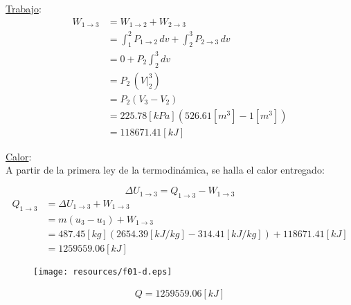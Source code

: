 \documentclass[letter,11pt]{article}
\begin{document}
\begin{enumerate}
\underline{Trabajo}: \\
\begin{equation*}
    \begin{split}
    W_{1\rightarrow 3} &= W_{1\rightarrow 2} + W_{2\rightarrow 3} \\
                       &= \int_1^2 P_{1\rightarrow 2}\,dv
                          + \int_2^3 P_{2\rightarrow 3}\,dv \\
                       &= 0 + P_2 \int_2^3 dv \\
                       &= P_2\,(V\Biggr|_2^3) \\
                       &= P_2(V_3-V_2) \\
                       &= 225.78[kPa](526.61[m^3]-1[m^3]) \\
                       &= 118671.41[kJ]
    \end{split}
\end{equation*}

\underline{Calor}: \\
A partir de la primera ley de la termodinámica, se halla el calor entregado:

\begin{equation*}
    \Delta U_{1\rightarrow 3} = Q_{1\rightarrow 3} - W_{1\rightarrow 3}
\end{equation*}
\begin{equation*}
    \begin{split}
        Q_{1\rightarrow 3} &= \Delta U_{1\rightarrow 3} + W_{1\rightarrow 3} \\
                           &= m(u_3 - u_1) + W_{1\rightarrow 3} \\
                           &= 487.45[kg](2654.39[kJ/kg]
                              -314.41[kJ/kg])+118671.41[kJ] \\
                           &= 1259559.06[kJ]
    \end{split}
\end{equation*}

\begin{figure}[H]
\centering
\texttt{[image: resources/f01-d.eps]}
\end{figure}

\begin{equation*}
\boxed{
    \begin{array}{l}
        Q = 1259559.06[kJ]
    \end{array}
}
\end{equation*}
\newpage


\end{enumerate}
\end{document}
